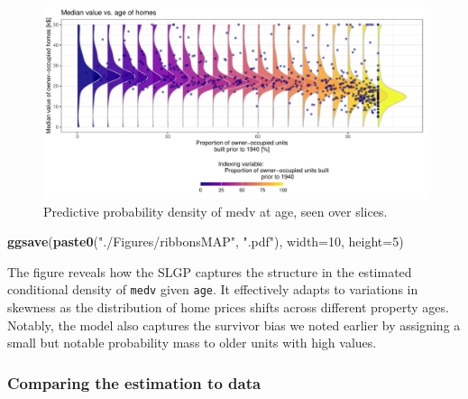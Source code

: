 \documentclass[
]{article}
\newenvironment{Shaded}{\begin{snugshade}}{\end{snugshade}}
\newcommand{\AttributeTok}[1]{\textcolor[rgb]{0.13,0.29,0.53}{#1}}
\newcommand{\DecValTok}[1]{\textcolor[rgb]{0.00,0.00,0.81}{#1}}
\newcommand{\FunctionTok}[1]{\textcolor[rgb]{0.13,0.29,0.53}{\textbf{#1}}}
\newcommand{\NormalTok}[1]{#1}
\newcommand{\StringTok}[1]{\textcolor[rgb]{0.31,0.60,0.02}{#1}}
\begin{document}
\begin{figure}[H]

{\centering \includegraphics{IntroductionSLGP_files/figure-latex/SLGPplotting2-1} 

}

\caption{Predictive probability density of medv at age, seen over slices.}\label{fig:SLGPplotting2}
\end{figure}

\begin{Shaded}
\begin{Highlighting}[]
\FunctionTok{ggsave}\NormalTok{(}\FunctionTok{paste0}\NormalTok{(}\StringTok{"./Figures/ribbonsMAP"}\NormalTok{,  }\StringTok{".pdf"}\NormalTok{), }\AttributeTok{width=}\DecValTok{10}\NormalTok{, }\AttributeTok{height=}\DecValTok{5}\NormalTok{)}
\end{Highlighting}
\end{Shaded}

The figure reveals how the SLGP captures the structure in the estimated conditional density of \texttt{medv} given \texttt{age}. It effectively adapts to variations in skewness as the distribution of home prices shifts across different property ages. Notably, the model also captures the survivor bias we noted earlier by assigning a small but notable probability mass to older units with high values.

\subsubsection{Comparing the estimation to data}\label{comparing-the-estimation-to-data}
\end{document}
